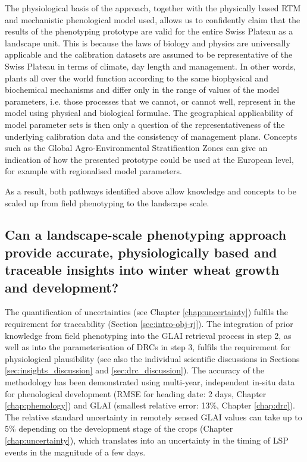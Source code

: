 The physiological basis of the approach, together with the physically based \gls{RTM} and mechanistic phenological model used, allows us to confidently claim that the results of the phenotyping prototype are valid for the entire Swiss Plateau as a landscape unit. This is because the laws of biology and physics are universally applicable and the calibration datasets are assumed to be representative of the Swiss Plateau in terms of climate, day length and management. In other words, plants all over the world function according to the same biophysical and biochemical mechanisms and differ only in the range of values of the model parameters, i.e. those processes that we cannot, or cannot well, represent in the model using physical and biological formulae. The geographical applicability of model parameter sets is then only a question of the representativeness of the underlying calibration data and the consistency of management plans. Concepts such as the Global Agro-Environmental Stratification Zones \citep{muecher_new_2016} can give an indication of how the presented prototype could be used at the European level, for example with regionalised model parameters.

As a result, both pathways identified above allow knowledge and concepts to be scaled up from field phenotyping to the landscape scale.

\subsection{Can a landscape-scale phenotyping approach provide accurate, physiologically based and traceable insights into winter wheat growth and development?}
The quantification of uncertainties (see Chapter \ref{chap:uncertainty}) fulfils the requirement for traceability (Section \ref{sec:intro-obj-rj}). The integration of prior knowledge from field phenotyping into the \gls{GLAI} retrieval process in step 2, as well as into the parameterisation of \gls{DRC}s in step 3, fulfils the requirement for physiological plausibility (see also the individual scientific discussions in Sections \ref{sec:insights_discussion} and \ref{sec:drc_discussion}). The accuracy of the methodology has been demonstrated using multi-year, independent in-situ data for phenological development (RMSE for heading date: 2 days, Chapter \ref{chap:phemology}) and GLAI (smallest relative error: 13\%, Chapter \ref{chap:drc}). The relative standard uncertainty in remotely sensed \gls{GLAI} values can take up to 5\% depending on the development stage of the crops (Chapter \ref{chap:uncertainty}), which translates into an uncertainty in the timing of \gls{LSP} events in the magnitude of a few days.

